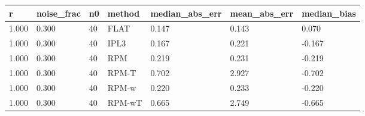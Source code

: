 \begin{tabular}{lllllll}
\hline
r & noise\_frac & n0 & method & median\_abs\_err & mean\_abs\_err & median\_bias \\
\hline
1.000 & 0.300 & 40 & FLAT & 0.147 & 0.143 & 0.070 \\
1.000 & 0.300 & 40 & IPL3 & 0.167 & 0.221 & -0.167 \\
1.000 & 0.300 & 40 & RPM & 0.219 & 0.231 & -0.219 \\
1.000 & 0.300 & 40 & RPM-T & 0.702 & 2.927 & -0.702 \\
1.000 & 0.300 & 40 & RPM-w & 0.220 & 0.233 & -0.220 \\
1.000 & 0.300 & 40 & RPM-wT & 0.665 & 2.749 & -0.665 \\
\hline
\end{tabular}
